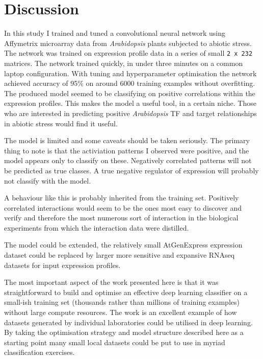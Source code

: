 \documentclass[12pt,a4paper,]{article}
\begin{document}
\hypertarget{discussion}{%
\section{Discussion}\label{discussion}}

In this study I trained and tuned a convolutional neural network using Affymetrix microarray data from \emph{Arabidopsis} plants subjected to abiotic stress. The network was trained on expression profile data in a series of small \texttt{2\ x\ 232} matrices. The network trained quickly, in under three minutes on a common laptop configuration. With tuning and hyperparameter optimisation the network achieved accuracy of 95\% on around 6000 training examples without overfitting. The produced model seemed to be classifying on positive correlations within the expression profiles. This makes the model a useful tool, in a certain niche. Those who are interested in predicting positive \emph{Arabidopsis} TF and target relationships in abiotic stress would find it useful.

The model is limited and some caveats should be taken seriously. The primary thing to note is that the activiation patterns I observed were positive, and the model appears only to classify on these. Negatively correlated patterns will not be predicted as true classes. A true negative regulator of expression will probably not classify with the model.

A behaviour like this is probably inherited from the training set. Positively correlated interactions would seem to be the ones most easy to discover and verify and therefore the most numerous sort of interaction in the biological experiments from which the interaction data were distilled.

The model could be extended, the relatively small AtGenExpress expression dataset could be replaced by larger more sensitive and expansive RNAseq datasets for input expression profiles.

The most important aspect of the work presented here is that it was straightforward to build and optimise an effective deep learning classifier on a small-ish training set (thousands rather than millions of training examples) without large compute resources. The work is an excellent example of how datasets generated by individual laboratories could be utilised in deep learning. By taking the optimisation strategy and model structure described here as a starting point many small local datasets could be put to use in myriad classification exercises.




\newpage
\singlespacing 
\renewcommand\refname{References}

\end{document}

